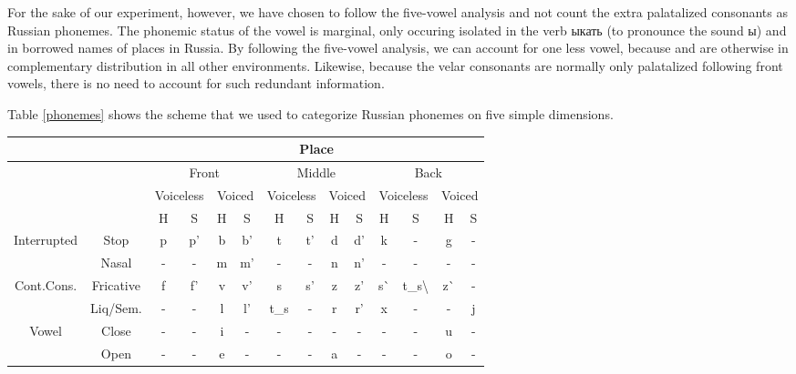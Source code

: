 \documentclass[11pt,a4paper]{article}
\begin{document}
For the sake of our experiment, however, we have chosen to follow the
five-vowel analysis and not count the extra palatalized consonants
as Russian phonemes. The phonemic status of the vowel \textipa{/\textbari/}
is marginal, only occuring isolated in the verb \foreignlanguage{russian}{ыкать}
(to pronounce the sound \foreignlanguage{russian}{ы}) and in borrowed names
of places in Russia. By following the five-vowel analysis, we can account for
one less vowel, because \textipa{/\textbari/} and  are otherwise
in complementary distribution in all other environments. Likewise, because
the velar consonants are normally only palatalized following front vowels,
there is no need to account for such redundant information.

Table \ref{phonemes} shows the scheme that we used to categorize Russian phonemes
on five simple dimensions.

\begin{table*}[t!]
\centering
\begin{tabular}{cccccccccccccc}
    \multicolumn{2}{c}{} & \multicolumn{12}{c}{Place}\\\hline
    \multicolumn{2}{c}{} & \multicolumn{4}{c}{Front} & \multicolumn{4}{c}{Middle} & \multicolumn{4}{c}{Back}\\\hline
    \multicolumn{2}{c}{} & \multicolumn{2}{c}{Voiceless} & \multicolumn{2}{c}{Voiced} & \multicolumn{2}{c}{Voiceless} & \multicolumn{2}{c}{Voiced} & \multicolumn{2}{c}{Voiceless} & \multicolumn{2}{c}{Voiced}\\\hline
    \multicolumn{2}{c}{} & H & S & H & S & H & S & H & S & H & S & H & S\\\hline
    \multirow{2}{50px}{Interrupted} & Stop & p & p' & b & b' & t & t' & d & d' & k & - & g & -\\
    & Nasal & - & - & m & m' & - & - & n & n' & - & - & - & - \\
    \multirow{2}{50px}{Cont.Cons.} & Fricative & f & f' & v & v' & s & s' & z & z' & s\` & t\_s\textbackslash & z\` & -\\
                                        & Liq/Sem. & - & - & l & l' & t\_s & - & r & r' & x & - & - & j\\
    \multirow{2}{50px}{Vowel} & Close & - & - & i & - & - & - & - & - & - & - & u & -\\
                              & Open & - & - & e & - & - & - & a & - & - & - & o & -\\
\end{tabular}
\caption{\label{phonemes} Categorization of Russian phonemes on five dimensions.
All phonemes are written using X-SAMPA.}
\end{table*}
\end{document}
